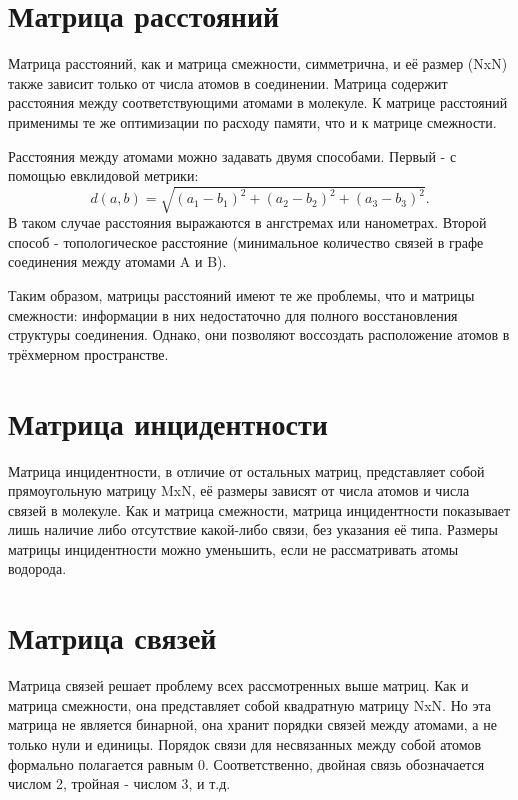 \documentclass[a4paper,14pt]{extreport}
\begin{document}
  \section{Матрица расстояний}
  \label{s:matrix_2_sec}
  Матрица расстояний, как и матрица смежности, симметрична, и её размер (NxN) также зависит только от числа атомов в соединении. Матрица содержит расстояния между соответствующими атомами в молекуле. К матрице расстояний применимы те же оптимизации по расходу памяти, что и к матрице смежности.
  
  Расстояния между атомами можно задавать двумя способами. Первый - с помощью евклидовой метрики:
  $$d(a,b)=\sqrt{(a_1-b_1)^2+(a_2-b_2)^2+(a_3-b_3)^2}.$$
  В таком случае расстояния выражаются в ангстремах или нанометрах. Второй способ - топологическое расстояние (минимальное количество связей в графе соединения между атомами A и B). 
  
  Таким образом, матрицы расстояний имеют те же проблемы, что и матрицы смежности: информации в них недостаточно для полного восстановления структуры соединения. Однако, они позволяют воссоздать расположение атомов в трёхмерном пространстве.


  \section{Матрица инцидентности}
  \label{s:matrix_3_sec}
  Матрица инцидентности, в отличие от остальных матриц, представляет собой прямоугольную матрицу MxN, её размеры зависят от числа атомов и числа связей в молекуле. Как и матрица смежности, матрица инцидентности показывает лишь наличие либо отсутствие какой-либо связи, без указания её типа. Размеры матрицы инцидентности можно уменьшить, если не рассматривать атомы водорода.

  \section{Матрица связей}
  \label{s:matrix_4_sec}
  Матрица связей решает проблему всех рассмотренных выше матриц. Как и матрица смежности, она представляет собой квадратную матрицу NxN. Но эта матрица не является бинарной, она хранит порядки связей между атомами, а не только нули и единицы. Порядок связи для несвязанных между собой атомов формально полагается равным 0. Соответственно, двойная связь обозначается числом 2, тройная - числом 3, и т.д.
\end{document}
